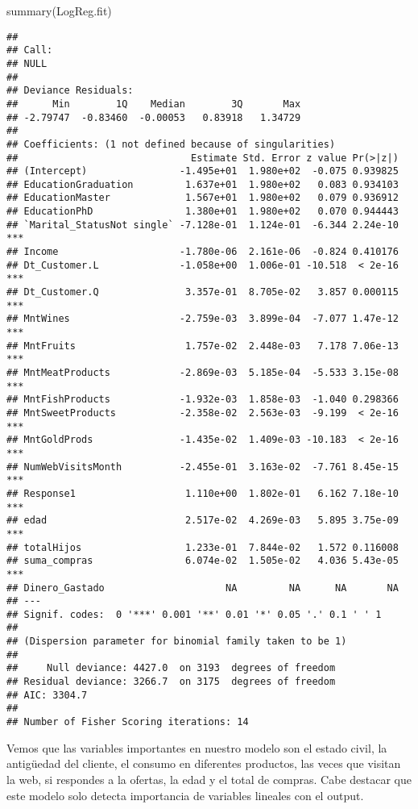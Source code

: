 \documentclass[
]{article}
\newenvironment{Shaded}{\begin{snugshade}}{\end{snugshade}}
\newcommand{\FunctionTok}[1]{\textcolor[rgb]{0.00,0.00,0.00}{#1}}
\newcommand{\NormalTok}[1]{#1}
\begin{document}
\begin{Shaded}
\begin{Highlighting}[]
\FunctionTok{summary}\NormalTok{(LogReg.fit)}
\end{Highlighting}
\end{Shaded}

\begin{verbatim}
## 
## Call:
## NULL
## 
## Deviance Residuals: 
##      Min        1Q    Median        3Q       Max  
## -2.79747  -0.83460  -0.00053   0.83918   1.34729  
## 
## Coefficients: (1 not defined because of singularities)
##                              Estimate Std. Error z value Pr(>|z|)    
## (Intercept)                -1.495e+01  1.980e+02  -0.075 0.939825    
## EducationGraduation         1.637e+01  1.980e+02   0.083 0.934103    
## EducationMaster             1.567e+01  1.980e+02   0.079 0.936912    
## EducationPhD                1.380e+01  1.980e+02   0.070 0.944443    
## `Marital_StatusNot single` -7.128e-01  1.124e-01  -6.344 2.24e-10 ***
## Income                     -1.780e-06  2.161e-06  -0.824 0.410176    
## Dt_Customer.L              -1.058e+00  1.006e-01 -10.518  < 2e-16 ***
## Dt_Customer.Q               3.357e-01  8.705e-02   3.857 0.000115 ***
## MntWines                   -2.759e-03  3.899e-04  -7.077 1.47e-12 ***
## MntFruits                   1.757e-02  2.448e-03   7.178 7.06e-13 ***
## MntMeatProducts            -2.869e-03  5.185e-04  -5.533 3.15e-08 ***
## MntFishProducts            -1.932e-03  1.858e-03  -1.040 0.298366    
## MntSweetProducts           -2.358e-02  2.563e-03  -9.199  < 2e-16 ***
## MntGoldProds               -1.435e-02  1.409e-03 -10.183  < 2e-16 ***
## NumWebVisitsMonth          -2.455e-01  3.163e-02  -7.761 8.45e-15 ***
## Response1                   1.110e+00  1.802e-01   6.162 7.18e-10 ***
## edad                        2.517e-02  4.269e-03   5.895 3.75e-09 ***
## totalHijos                  1.233e-01  7.844e-02   1.572 0.116008    
## suma_compras                6.074e-02  1.505e-02   4.036 5.43e-05 ***
## Dinero_Gastado                     NA         NA      NA       NA    
## ---
## Signif. codes:  0 '***' 0.001 '**' 0.01 '*' 0.05 '.' 0.1 ' ' 1
## 
## (Dispersion parameter for binomial family taken to be 1)
## 
##     Null deviance: 4427.0  on 3193  degrees of freedom
## Residual deviance: 3266.7  on 3175  degrees of freedom
## AIC: 3304.7
## 
## Number of Fisher Scoring iterations: 14
\end{verbatim}

Vemos que las variables importantes en nuestro modelo son el estado
civil, la antigüedad del cliente, el consumo en diferentes productos,
las veces que visitan la web, si respondes a la ofertas, la edad y el
total de compras. Cabe destacar que este modelo solo detecta importancia
de variables lineales con el output.
\end{document}
